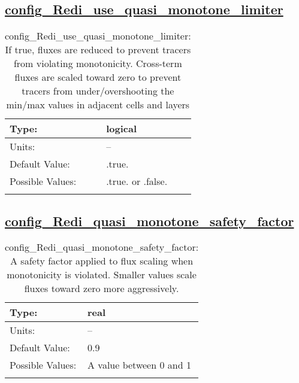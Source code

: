\subsection[config\_Redi\_use\_quasi\_monotone\_limiter]{\hyperref[sec:nm_tab_Redi_isopycnal_mixing]{config\_Redi\_use\_quasi\_monotone\_limiter}}
\label{subsec:nm_sec_config_Redi_use_quasi_monotone_limiter}
\begin{center}
\begin{longtable}{| p{2.0in} || p{4.0in} |}
    \hline
    Type: & logical \\
    \hline
    Units: & -- \\
    \hline
    Default Value: & .true. \\
    \hline
    Possible Values: & .true. or .false. \\
    \hline
    \caption{config\_Redi\_use\_quasi\_monotone\_limiter: If true, fluxes are reduced to prevent tracers from violating monotonicity. Cross-term fluxes are scaled toward zero to prevent tracers from under/overshooting the min/max values in adjacent cells and layers}
\end{longtable}
\end{center}
\subsection[config\_Redi\_quasi\_monotone\_safety\_factor]{\hyperref[sec:nm_tab_Redi_isopycnal_mixing]{config\_Redi\_quasi\_monotone\_safety\_factor}}
\label{subsec:nm_sec_config_Redi_quasi_monotone_safety_factor}
\begin{center}
\begin{longtable}{| p{2.0in} || p{4.0in} |}
    \hline
    Type: & real \\
    \hline
    Units: & -- \\
    \hline
    Default Value: & 0.9 \\
    \hline
    Possible Values: & A value between 0 and 1 \\
    \hline
    \caption{config\_Redi\_quasi\_monotone\_safety\_factor: A safety factor applied to flux scaling when monotonicity is violated. Smaller values scale fluxes toward zero more aggressively.}
\end{longtable}
\end{center}
